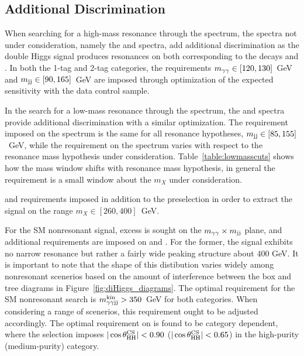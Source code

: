 \subsection{Additional Discrimination\label{subsec:add_discrimination}}

When searching for a high-mass resonance through the \Mggjjk spectrum, the spectra not under
consideration, namely the \Mgg and \Mjj spectra, add additional discrimination as the double Higgs
signal produces resonances on both corresponding to the decays \Hgg and \Hbb. In both
the 1-tag and 2-tag categories, the requirements $m_{\gamma\gamma} \in [120, 130]$~GeV and $m_{\rm jj} \in [90, 165]$~GeV
are imposed through optimization of the expected sensitivity with the data control sample.

In the search for a low-mass resonance through the \Mgg spectrum, the \Mjj and \Mggjj spectra
provide additional discrimination with a similar optimization. The requirement imposed
on the \Mjj spectrum is the same for all resonance hypotheses, $m_{\rm jj} \in [85,155]$~GeV, while the
requirement on the \Mggjj spectrum varies with respect to the resonance mass hypothesis
under consideration.
Table~\ref{table:lowmasscuts} shows how the \Mggjj mass window shifts with resonance mass hypothesis,
in general the requirement is a small window about the $m_X$ under consideration.

\begin{table}[ht]
  \centering
  \renewcommand{\arraystretch}{1.4}
  \caption{\Mggjj and \Mjj requirements imposed in addition to the preselection in order to extract
the signal on the range $m_X \in [260, 400]$~GeV.}
  
  \label{table:lowmasscuts}
\end{table}

For the SM nonresonant signal, excess is sought on the $m_{\gamma\gamma} \times m_{\rm jj}$ plane, and additional
requirements are imposed on \Mggjjk and \acosthetastar. For the former, the signal
exhibits no narrow resonance but rather a fairly wide peaking structure about 400 GeV. It is important
to note that the shape of this distibution varies widely among nonresonant scenerios based on
the amount of interference between the box and tree diagrams in Figure~\ref{fig:diHiggs_diagrams}.
The optimal requirement for the SM nonresonant search is $m_{\gamma\gamma {\rm jj}}^{\rm kin} > 350$~GeV for both categories.
When considering a range of scenerios, this requirement ought to be adjusted accordingly.
The optimal requirement on \acosthetastar is found to be category dependent, where the selection
imposes $|\cos {\theta^{\rm CS}_{\rm HH}}| < 0.90$ ($|\cos {\theta^{\rm CS}_{\rm HH}}| < 0.65$) in the high-purity (medium-purity) category.
